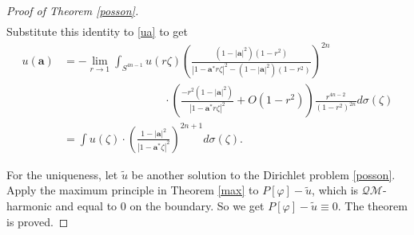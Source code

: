 \documentclass[10pt,a4paper]{amsart}
\begin{document}
\begin{proof}[Proof of Theorem \ref{posson}]
\begin{align*}
\end{align*}
Substitute this identity to \eqref{ua} to get
\begin{equation}\begin{aligned}\label{poisson ua}
u(\mathbf{a})
&= -\lim_{r \to 1} \int_{S^{4n-1}}u(r\zeta) \left( \frac{(1 - |\mathbf{a}|^2)(1 - r^2)}{|1 - \mathbf{a}^* r\zeta |^2 - (1 - |\mathbf{a}|^2)(1 - r^2)} \right)^{2n} \\
&\qquad\qquad\qquad\qquad\quad \cdot  \left( \frac{-r^2(1 - |\mathbf{a}|^2)}{|1 - \mathbf{a}^* r\zeta |^2}+O(1 - r^2) \right)\frac{r^{4n-2}}{(1 - r^2)^{2n}} d\sigma(\zeta) \\
&= \int u(\zeta) \cdot \left( \frac{1 - |\mathbf{a}|^2}{|1-\mathbf{a}^*\zeta|^2} \right)^{2n+1} d\sigma(\zeta).
\end{aligned}\end{equation}

For the uniqueness, let $\widetilde{u}$ be another solution to the Dirichlet problem \eqref{posson}. Apply the maximum principle in Theorem \ref{max} to $P[\varphi]-\widetilde{u}$, which is $\mathcal{QM}$-harmonic and equal to $0$ on the boundary. So we get $P[\varphi]-\widetilde{u}\equiv0$. The theorem is proved.
\end{proof}
\end{document}
